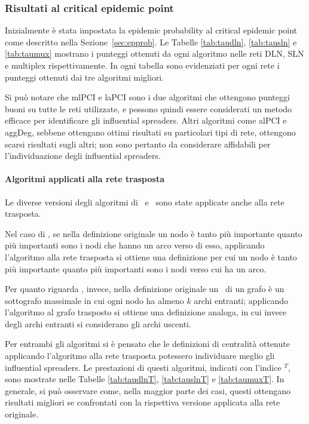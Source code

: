 \subsubsection{Risultati al critical epidemic point}

Inizialmente è stata impostata la epidemic probability al critical epidemic point come 
descritto nella Sezione~\vref{sec:epprob}.
Le Tabelle \ref{tab:taudln}, \ref{tab:tausln} e \ref{tab:taumux} mostrano i punteggi 
ottenuti da ogni algoritmo nelle reti DLN, SLN e multiplex rispettivamente.
In ogni tabella sono evidenziati per ogni rete i punteggi ottenuti dai tre algoritmi 
migliori. 

Si può notare che mlPCI e laPCI sono i due algoritmi che ottengono punteggi buoni 
su tutte le reti utilizzate, e possono quindi essere considerati un metodo efficace per identificare 
gli influential spreaders. 
Altri algoritmi come alPCI e aggDeg, sebbene ottengano ottimi risultati su
particolari tipi di rete, ottengono scarsi risultati sugli altri; non sono pertanto da 
considerare affidabili per l'individuazione degli influential spreaders.





\paragraph{Algoritmi applicati alla rete trasposta}
Le diverse versioni degli algoritmi di \PageRank\ e \kcore\ sono state applicate anche alla rete trasposta.

Nel caso di \PageRank, se nella definizione originale un nodo è tanto più importante quanto 
più importanti sono i nodi che hanno un arco verso di esso, applicando l'algoritmo alla rete trasposta si ottiene
una definizione per cui un nodo è tanto più importante quanto più importanti sono i nodi verso cui ha un arco.

Per quanto riguarda \kcore, invece, nella definizione originale un \kcore\ di un grafo è un sottografo 
massimale in cui ogni nodo ha almeno $k$ archi entranti; applicando l'algoritmo al grafo trasposto si ottiene 
una definizione analoga, in cui invece degli archi entranti si considerano gli archi uscenti.

Per entrambi gli algoritmi si è pensato che le definizioni di centralità ottenute applicando l'algoritmo 
alla rete trasposta potessero individuare meglio gli influential spreaders. Le prestazioni di questi algoritmi, indicati 
con l'indice $^T$, sono mostrate nelle Tabelle \ref{tab:taudlnT}, \ref{tab:tauslnT} e \ref{tab:taumuxT}.
In generale, si può osservare come, nella maggior parte dei casi, questi ottengano risultati migliori se confrontati con 
la rispettiva versione applicata alla rete originale. 

